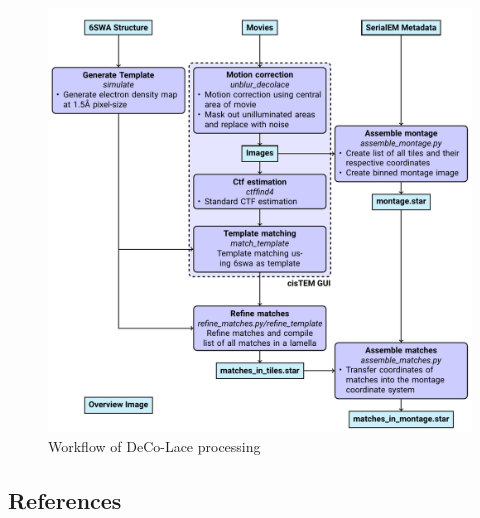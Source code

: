 \documentclass[
]{article}
\begin{document}
\begin{figure}
\hypertarget{fig:deco_lace_workflow}{%
\centering
\includegraphics{figures/deco_lace_workflow.pdf}
\caption{Workflow of DeCo-Lace processing}\label{fig:deco_lace_workflow}
}
\end{figure}

\hypertarget{references}{%
\subsection{References}\label{references}}
\end{document}
